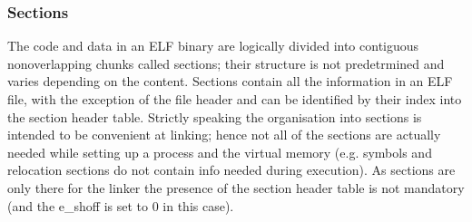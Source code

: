 \subsubsection{Sections}
The code and data in an ELF binary are logically divided into contiguous nonoverlapping chunks called sections; their structure is not predetrmined and varies depending on the content.  Sections contain all the information in an ELF file, with the exception of the file header and can be identified by their index into the section header table.  Strictly speaking the organisation into sections is intended to be convenient at linking; hence not all of the sections are actually needed while setting up a process and the virtual memory (e.g.  symbols and relocation sections do not contain info needed during execution). As sections are only there for the linker the presence of the section header   table is not mandatory (and the {\ttfamily e\_shoff} is set to 0 in this case).
